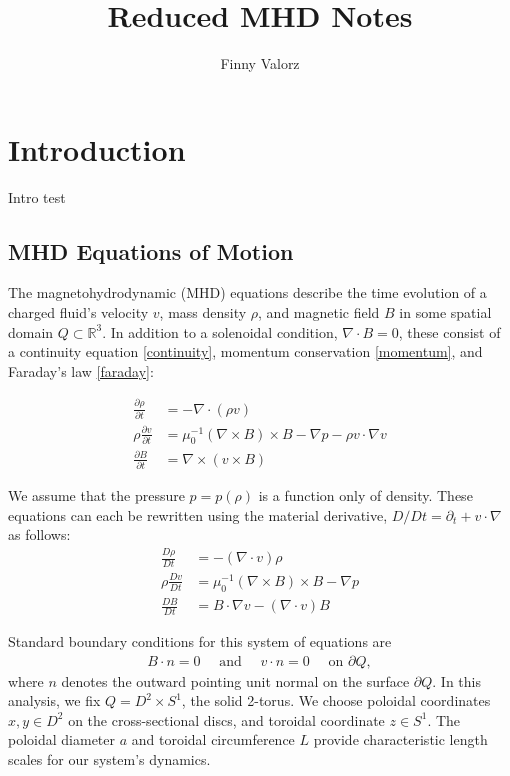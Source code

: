 \documentclass{article}
\title{Reduced MHD Notes}
\author{Finny Valorz}
\newcommand{\p}{\partial}
\newcommand{\deriv}[2]{\frac{\p #1}{\p #2}}
\newcommand{\pth} [1] {\left( #1 \right) }
\begin{document}
\maketitle


\section{Introduction}
Intro test

\subsection{MHD Equations of Motion}
The magnetohydrodynamic (MHD) equations describe the time evolution of a charged fluid's velocity $v$, mass density $\rho$, and magnetic field $B$ in some spatial domain $Q\subset \mathbb{R}^3$. In addition to a solenoidal condition, $\nabla\cdot B=0$, these consist of a continuity equation \eqref{continuity}, momentum conservation \eqref{momentum}, and Faraday's law \eqref{faraday}:

\begin{align}
    \deriv{\rho}{t} &= -\nabla\cdot \pth{\rho v} \label{continuity} \\ 
    \rho\deriv{v}{t} &= \mu_0^{-1} \pth{\nabla\times B} \times B - \nabla p - \rho v\cdot\nabla v \label{momentum} \\ 
    \deriv{B}{t} &= \nabla \times \pth{v\times B} \label{faraday}
\end{align}

We assume that the pressure $p=p(\rho)$ is a function only of density. These equations can each be rewritten using the material derivative, $D/Dt = \p_t + v\cdot\nabla$ as follows: 
\begin{align} 
    \frac{D\rho}{Dt} &= -(\nabla\cdot v)\rho \label{material continuity} \\
    \rho\frac{Dv}{Dt} &= \mu_0^{-1}(\nabla\times B)\times B - \nabla p \label{material momentum} \\ 
    \frac{DB}{Dt} &= B\cdot\nabla v - (\nabla\cdot v)B \label{material faraday}
\end{align}

Standard boundary conditions for this system of equations are
\begin{align*} 
    B\cdot n = 0 \quad \text{ and }\quad  v\cdot n = 0 \quad \text{ on }\p Q,
\end{align*}
where $n$ denotes the outward pointing unit normal on the surface $\p Q$. In this analysis, we fix $Q=D^2\times S^1$, the solid 2-torus. We choose poloidal coordinates $x,y\in D^2$ on the cross-sectional discs, and toroidal coordinate $z \in S^1$. The poloidal diameter $a$ and toroidal circumference $L$ provide characteristic length scales for our system's dynamics. 
\end{document}
